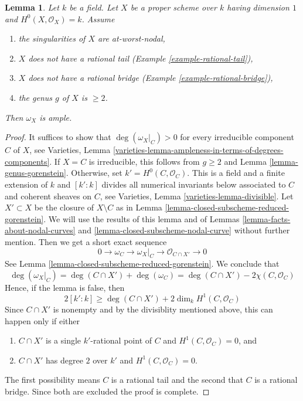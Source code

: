 \documentclass{stacks-project}
\theoremstyle{plain}
\newtheorem{lemma}[subsection]{Lemma}
\theoremstyle{definition}
\theoremstyle{remark}
\numberwithin{equation}{subsection}
\begin{document}
\begin{lemma}
\label{lemma-no-rational-bridge-ample-genus-geq-2}
Let $k$ be a field. Let $X$ be a proper scheme over $k$ having dimension $1$
and $H^0(X, \mathcal{O}_X) = k$. Assume
\begin{enumerate}
\item the singularities of $X$ are at-worst-nodal,
\item $X$ does not have a rational tail
(Example \ref{example-rational-tail}),
\item $X$ does not have a rational bridge
(Example \ref{example-rational-bridge}),
\item the genus $g$ of $X$ is $\geq 2$.
\end{enumerate}
Then $\omega_X$ is ample.
\end{lemma}

\begin{proof}
It suffices to show that $\deg(\omega_X|_C) > 0$ for every irreducible
component $C$ of $X$, see Varieties, Lemma
\ref{varieties-lemma-ampleness-in-terms-of-degrees-components}.
If $X = C$ is irreducible, this follows from $g \geq 2$
and Lemma \ref{lemma-genus-gorenstein}.
Otherwise, set $k' = H^0(C, \mathcal{O}_C)$. This
is a field and a finite extension of $k$ and $[k' : k]$
divides all numerical invariants below associated to $C$ and
coherent sheaves on $C$, see
Varieties, Lemma \ref{varieties-lemma-divisible}.
Let $X' \subset X$ be the closure of $X \setminus C$ as in
Lemma \ref{lemma-closed-subscheme-reduced-gorenstein}.
We will use the results of this lemma and of
Lemmas \ref{lemma-facts-about-nodal-curves} and
\ref{lemma-closed-subscheme-nodal-curve} without further mention.
Then we get a short exact sequence
$$
0 \to \omega_C \to \omega_X|_C \to \mathcal{O}_{C \cap X'} \to 0
$$
See Lemma \ref{lemma-closed-subscheme-reduced-gorenstein}.
We conclude that
$$
\deg(\omega_X|_C) = \deg(C \cap X') + \deg(\omega_C) =
\deg(C \cap X') - 2\chi(C, \mathcal{O}_C)
$$
Hence, if the lemma is false, then
$$
2[k' : k] \geq \deg(C \cap X') + 2\dim_k H^1(C, \mathcal{O}_C)
$$
Since $C \cap X'$ is nonempty and by the divisiblity mentioned above,
this can happen only if either
\begin{enumerate}
\item[(a)] $C \cap X'$ is a single $k'$-rational point of $C$ and
$H^1(C, \mathcal{O}_C) = 0$, and
\item[(b)] $C \cap X'$ has degree $2$ over $k'$ and
$H^1(C, \mathcal{O}_C) = 0$.
\end{enumerate}
The first possibility means $C$ is a rational tail
and the second that $C$ is a rational bridge.
Since both are excluded the proof is complete.
\end{proof}
\end{document}
